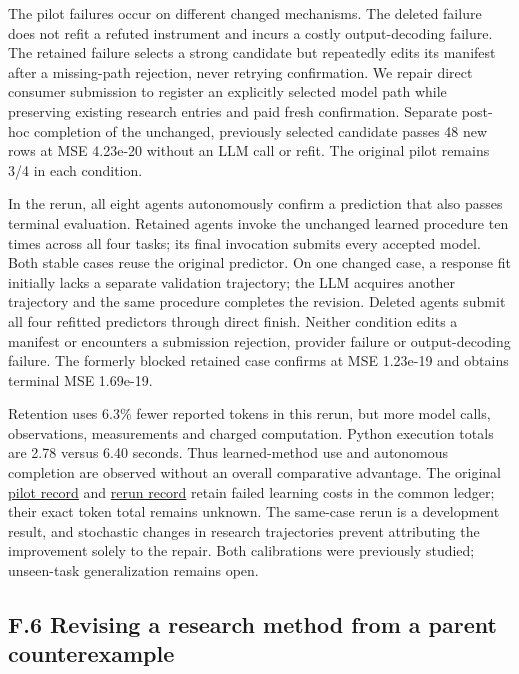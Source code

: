 \documentclass[11pt,a4paper]{article}
\begin{document}
The pilot failures occur on different changed mechanisms. The deleted failure
does not refit a refuted instrument and incurs a costly output-decoding failure.
The retained failure selects a strong candidate but repeatedly edits its manifest
after a missing-path rejection, never retrying confirmation. We repair direct
consumer submission to register an explicitly selected model path while preserving
existing research entries and paid fresh confirmation. Separate post-hoc completion
of the unchanged, previously selected candidate passes 48 new rows at MSE 4.23e-20
without an LLM call or refit. The original pilot remains 3/4 in each condition.


In the rerun, all eight agents autonomously confirm a prediction that also passes
terminal evaluation. Retained agents invoke the unchanged learned procedure ten
times across all four tasks; its final invocation submits every accepted model.
Both stable cases reuse the original predictor. On one changed case, a response
fit initially lacks a separate validation trajectory; the LLM acquires another
trajectory and the same procedure completes the revision. Deleted agents submit
all four refitted predictors through direct finish. Neither condition edits a
manifest or encounters a submission rejection, provider failure or output-decoding
failure. The formerly blocked retained case confirms at MSE 1.23e-19 and obtains
terminal MSE 1.69e-19.


Retention uses 6.3\% fewer reported tokens in this rerun, but more model calls,
observations, measurements and charged computation. Python execution totals are
2.78 versus 6.40 seconds. Thus learned-method use and autonomous completion are
observed without an overall comparative advantage. The original
\hyperlink{artifact-67}{pilot record}
and \hyperlink{artifact-68}{rerun record}
retain failed learning costs in the common ledger; their exact token total remains
unknown. The same-case rerun is a development result, and stochastic changes in
research trajectories prevent attributing the improvement solely to the repair.
Both calibrations were previously studied; unseen-task generalization remains open.


\subsection*{F.6 Revising a research method from a parent counterexample}
\end{document}
